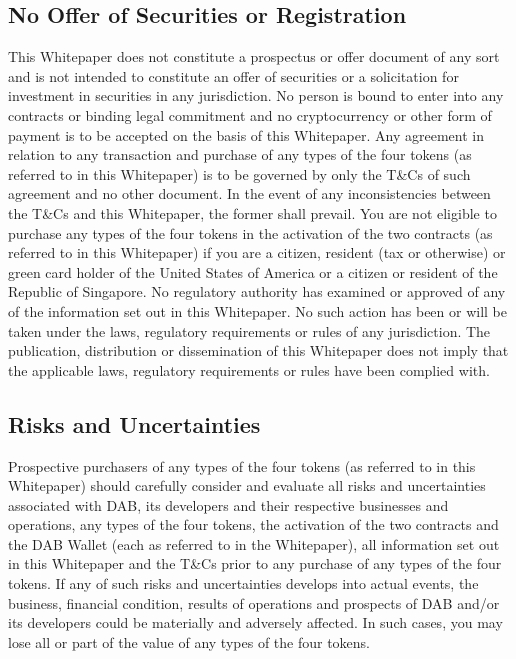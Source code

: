 \documentclass[review]{elsarticle}
\begin{document}
\subsection{No Offer of Securities or Registration}
This Whitepaper does not constitute a prospectus or offer document of any sort and is not intended to constitute an offer of securities or a solicitation for investment in securities in any jurisdiction. No person is bound to enter into any contracts or binding legal commitment and no cryptocurrency or other form of payment is to be accepted on the basis of this Whitepaper. Any agreement in relation to any transaction and purchase of any types of the four tokens (as referred to in this Whitepaper) is to be governed by only the T\&Cs of such agreement and no other document. In the event of any inconsistencies between the T\&Cs and this Whitepaper, the former shall prevail. 
You are not eligible to purchase any types of the four tokens in the activation of the two contracts (as referred to in this Whitepaper) if you are a citizen, resident (tax or otherwise) or green card holder of the United States of America or a citizen or resident of the Republic of Singapore. 
No regulatory authority has examined or approved of any of the information set out in this Whitepaper. No such action has been or will be taken under the laws, regulatory requirements or rules of any jurisdiction. The publication, distribution or dissemination of this Whitepaper does not imply that the applicable laws, regulatory requirements or rules have been complied with.

\subsection{Risks and Uncertainties}
Prospective purchasers of any types of the four tokens (as referred to in this Whitepaper) should carefully consider and evaluate all risks and uncertainties associated with DAB, its developers and their respective businesses and operations, any types of the four tokens, the activation of the two contracts and the DAB Wallet (each as referred to in the Whitepaper), all information set out in this Whitepaper and the T\&Cs prior to any purchase of any types of the four tokens. If any of such risks and uncertainties develops into actual events, the business, financial condition, results of operations and prospects of DAB and/or its developers could be materially and adversely affected. In such cases, you may lose all or part of the value of any types of the four tokens.
\end{document}
